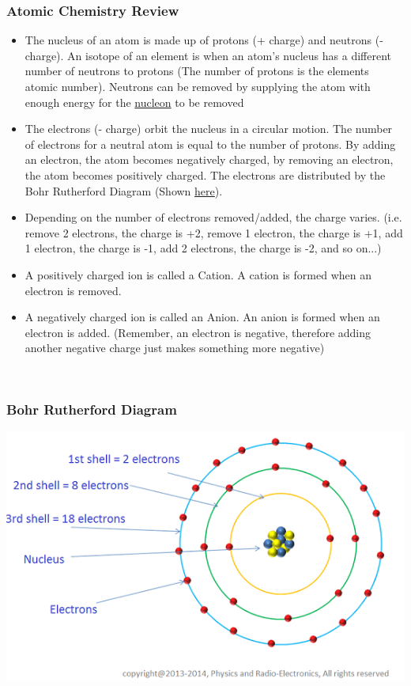\documentclass{article}
\begin{document}
\subsubsection{Atomic Chemistry Review}
\begin{itemize}
    \item The nucleus of an atom is made up of protons (+ charge) and neutrons (- charge). An isotope of an element is when an atom's nucleus has a different number of neutrons to protons (The number of protons is the elements atomic number). Neutrons can be removed by supplying the atom with enough energy for the \hyperref[sec:nucleon]{nucleon} to be removed
    \item The electrons (- charge) orbit the nucleus in a circular motion. The number of electrons for a neutral atom is equal to the number of protons. By adding an electron, the atom becomes negatively charged, by removing an electron, the atom becomes positively charged. The electrons are distributed by the Bohr Rutherford Diagram (Shown \hyperref[sec:electronwaves]{here}).
    \item Depending on the number of electrons removed/added, the charge varies. (i.e. remove 2 electrons, the charge is +2, remove 1 electron, the charge is +1, add 1 electron, the charge is -1, add 2 electrons, the charge is -2, and so on...)
    \item A positively charged ion is called a Cation. A cation is formed when an electron is removed.
    \item A negatively charged ion is called an Anion. An anion is formed when an electron is added. (Remember, an electron is negative, therefore adding another negative charge just makes something more negative)
\end{itemize}\leavevmode\\

\subsubsection{Bohr Rutherford Diagram}
\includegraphics[scale=0.5]{images/atom_orbitals.png}\label{sec:atomorbitals}
\end{document}
